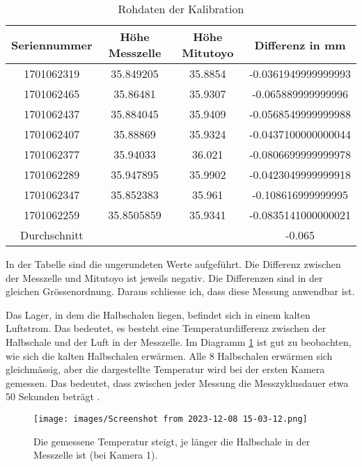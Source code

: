\begin{table}[h]
   
  \caption{Rohdaten der Kalibration}
  \begin{tabular}{cccc}
    \hline
    Seriennummer & Höhe Messzelle & Höhe Mitutoyo & Differenz in mm \\
    \hline
    1701062319 & 35.849205 & 35.8854 & -0.0361949999999993 \\
    1701062465 & 35.86481 & 35.9307 & -0.065889999999996 \\
    1701062437 & 35.884045 & 35.9409 & -0.0568549999999988 \\
    1701062407 & 35.88869 & 35.9324 & -0.0437100000000044 \\
    1701062377 & 35.94033 & 36.021 & -0.0806699999999978 \\
    1701062289 & 35.947895 & 35.9902 & -0.0423049999999918 \\
    1701062347 & 35.852383 & 35.961 & -0.108616999999995 \\
    1701062259 & 35.8505859 & 35.9341 & -0.0835141000000021 \\
    \hline
    Durchschnitt & & & -0.065 \\
    \hline
  \end{tabular}
\end{table}

In der Tabelle sind die ungerundeten Werte aufgeführt. Die Differenz zwischen der Messzelle und Mitutoyo ist jeweils negativ. Die Differenzen sind in der gleichen Grössenordnung. Daraus schliesse ich, dass diese Messung anwendbar ist.

Das Lager, in dem die Halbschalen liegen, befindet sich in einem kalten Luftstrom. Das bedeutet, es besteht eine Temperaturdifferenz zwischen der Halbschale und der Luft in der Messzelle. Im Diagramm \ref{fig:TempDiff} ist gut zu beobachten, wie sich die kalten Halbschalen erwärmen. Alle 8 Halbschalen erwärmen sich gleichmässig, aber die dargestellte Temperatur wird bei der ersten Kamera gemessen. Das bedeutet, dass zwischen jeder Messung die Messzyklusdauer etwa 50 Sekunden beträgt \cite{TempLink}.

\newpage
\begin{figure}
   
  \texttt{[image: images/Screenshot from 2023-12-08 15-03-12.png]}
  \caption{Die gemessene Temperatur steigt, je länger die Halbschale in der Messzelle ist (bei Kamera 1).}
  \label{fig:TempDiff}
\end{figure}

